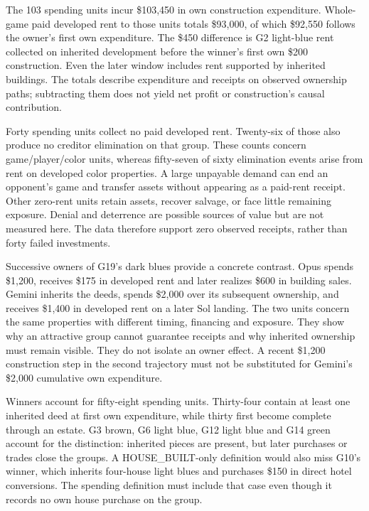 The 103 spending units incur \$103,450 in own construction expenditure. Whole-game paid developed rent to those units totals \$93,000, of which \$92,550 follows the owner's first own expenditure. The \$450 difference is G2 light-blue rent collected on inherited development before the winner's first own \$200 construction. Even the later window includes rent supported by inherited buildings. The totals describe expenditure and receipts on observed ownership paths; subtracting them does not yield net profit or construction's causal contribution.

Forty spending units collect no paid developed rent. Twenty-six of those also produce no creditor elimination on that group. These counts concern game/player/color units, whereas fifty-seven of sixty elimination events arise from rent on developed color properties. A large unpayable demand can end an opponent's game and transfer assets without appearing as a paid-rent receipt. Other zero-rent units retain assets, recover salvage, or face little remaining exposure. Denial and deterrence are possible sources of value but are not measured here. The data therefore support zero observed receipts, rather than forty failed investments.

Successive owners of G19's dark blues provide a concrete contrast. Opus spends \$1,200, receives \$175 in developed rent and later realizes \$600 in building sales. Gemini inherits the deeds, spends \$2,000 over its subsequent ownership, and receives \$1,400 in developed rent on a later Sol landing. The two units concern the same properties with different timing, financing and exposure. They show why an attractive group cannot guarantee receipts and why inherited ownership must remain visible. They do not isolate an owner effect. A recent \$1,200 construction step in the second trajectory must not be substituted for Gemini's \$2,000 cumulative own expenditure.

Winners account for fifty-eight spending units. Thirty-four contain at least one inherited deed at first own expenditure, while thirty first become complete through an estate. G3 brown, G6 light blue, G12 light blue and G14 green account for the distinction: inherited pieces are present, but later purchases or trades close the groups. A HOUSE\_BUILT-only definition would also miss G10's winner, which inherits four-house light blues and purchases \$150 in direct hotel conversions. The spending definition must include that case even though it records no own house purchase on the group.

